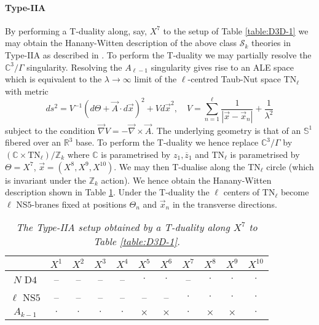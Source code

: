 \documentclass[main.tex]{subfiles}
\begin{document}
\paragraph{Type-IIA}
By performing a T-duality along, say, $X^7$ to the setup of Table \ref{table:D3D-1} we may obtain the Hanany-Witten description of the above class $\mathcal{S}_k$ theories in Type-IIA as described in \cite{Gaiotto:2015usa}.  To perform the T-duality we may partially resolve the $\mathbb{C}^3/\Gamma$ singularity.  Resolving the $A_{\ell-1}$ singularity gives rise to an ALE space which is equivalent to the $\lambda\to\infty$ limit of the $\ell$-centred Taub-Nut space TN$_{\ell}$ with metric
\begin{equation}
ds^2=V^{-1}\left(d\Theta+\vec{A}\cdot d\vec{x}\right)^2+Vd\vec{x}^2,\quad V=\sum_{n=1}^{\ell}\frac{1}{\left|\vec{x}-\vec{x}_n\right|}+\frac{1}{\lambda^2}
\end{equation}
subject to the condition $\vec{\nabla}V=-\vec{\nabla}\times\vec{A}$.  The underlying geometry is that of an $\mathbb{S}^1$ fibered over an $\mathbb{R}^3$ base.  To perform the T-duality we hence replace $\mathbb{C}^3/\Gamma$ by $\left(\mathbb{C}\times \text{TN}_{\ell}\right)/\mathbb{Z}_{k}$ where $\mathbb{C}$ is parametrised by $z_{1},\overline{z}_{1}$ and TN$_{\ell}$ is parametrised by $\Theta=X^7$, $\vec{x}=\left(X^8,X^9,X^{10}\right)$.  We may then T-dualise along the TN$_{\ell}$ circle (which is invariant under the $\mathbb{Z}_{k}$ action).  We hence obtain the Hanany-Witten description shown in Table \ref{table:D4D01}.  Under the T-duality the $\ell$ centers of TN$_{\ell}$ become $\ell$ NS$5$-branes fixed at positions $\Theta_n$ and $\vec{x}_n$ in the transverse directions.
\begin{table}[h!]
\centering
\begin{tabular}{ |c |c| c| c| c| c| c| c| c| c| c| }
\hline
   & $X^1$ & $X^2$ & $X^3$ & $X^4$ & $X^5$ & $X^6$ & $X^7$ & $X^8$ & $X^9$& $X^{10}$\\\hline 
 $N$ D$4$ & -- & -- & -- & -- & $\cdot$ & $\cdot$ & -- & $\cdot$ & $\cdot$ & $\cdot$\\ \hline
 $\ell$ NS$5$ & -- & -- & -- & -- & -- & -- & $\cdot$ & $\cdot$& $\cdot$ & $\cdot$\\ \hline
 $A_{k-1}$ & $\cdot$ & $\cdot$ & $\cdot$ & $\cdot$ & $\times$ & $\times$ & $\cdot$ & $\times$ & $\times$ & $\cdot$\\ \hline
\end{tabular}
\caption{\it The Type-IIA setup obtained by a T-duality along $X^7$ to Table \ref{table:D3D-1}.}
\label{table:D4D01}
\end{table}
\end{document}
